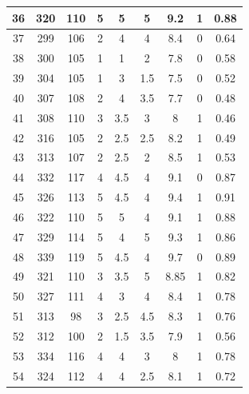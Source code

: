 \documentclass[11pt]{article}
\begin{document}
\begin{appendix}
\begin{longtable}[H]{|c|c|c|c|c|c|c|c|c|}
	36         & 320       & 110         & 5  & 5   & 5   & 9.2  & 1        & 0.88            \\ \hline
	37         & 299       & 106         & 2  & 4   & 4   & 8.4  & 0        & 0.64            \\ \hline
	38         & 300       & 105         & 1 & 1   & 2   & 7.8  & 0        & 0.58            \\ \hline
	39         & 304       & 105         & 1  & 3   & 1.5 & 7.5  & 0        & 0.52            \\ \hline
	40         & 307       & 108         & 2   & 4   & 3.5 & 7.7  & 0        & 0.48            \\ \hline
	41         & 308       & 110         & 3& 3.5 & 3   & 8    & 1        & 0.46            \\ \hline
	42         & 316       & 105         & 2 & 2.5 & 2.5 & 8.2  & 1        & 0.49            \\ \hline
	43         & 313       & 107         & 2 & 2.5 & 2   & 8.5  & 1        & 0.53            \\ \hline
	44         & 332       & 117         & 4  & 4.5 & 4   & 9.1  & 0        & 0.87            \\ \hline
	45         & 326       & 113         & 5  & 4.5 & 4   & 9.4  & 1        & 0.91            \\ \hline
	46         & 322       & 110         & 5  & 5   & 4   & 9.1  & 1        & 0.88            \\ \hline
	47         & 329       & 114         & 5   & 4   & 5   & 9.3  & 1        & 0.86            \\ \hline
	48         & 339       & 119         & 5  & 4.5 & 4   & 9.7  & 0        & 0.89            \\ \hline
	49         & 321       & 110         & 3   & 3.5 & 5   & 8.85 & 1        & 0.82            \\ \hline
	50         & 327       & 111         & 4  & 3   & 4   & 8.4  & 1        & 0.78            \\ \hline
	51         & 313       & 98          & 3  & 2.5 & 4.5 & 8.3  & 1        & 0.76            \\ \hline
	52         & 312       & 100         & 2  & 1.5 & 3.5 & 7.9  & 1        & 0.56            \\ \hline
	53         & 334       & 116         & 4   & 4   & 3   & 8    & 1        & 0.78            \\ \hline
	54         & 324       & 112         & 4& 4   & 2.5 & 8.1  & 1        & 0.72            \\ \hline

\end{longtable}
\end{appendix}
\end{document}
